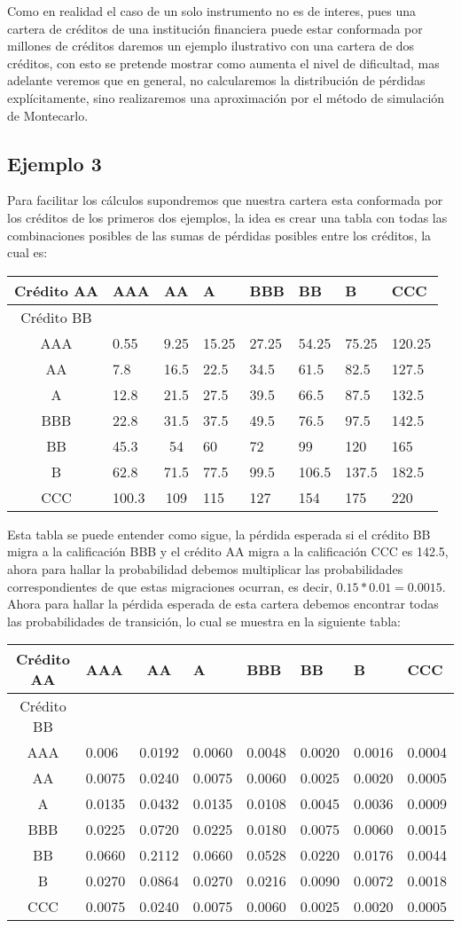 \documentclass[
  12pt,
]{krantz}
\theoremstyle{definition}
\theoremstyle{definition}
\theoremstyle{definition}
\theoremstyle{remark}
\begin{document}
Como en realidad el caso de un solo instrumento no es de interes, pues una cartera de créditos de una institución financiera puede estar conformada por millones de créditos daremos un ejemplo ilustrativo con una cartera de dos créditos, con esto se pretende mostrar como aumenta el nivel de dificultad, mas adelante veremos que en general, no calcularemos la distribución de pérdidas explícitamente, sino realizaremos una aproximación por el método de simulación de Montecarlo.

\hypertarget{ejemplo-3}{%
\subsection{Ejemplo 3}\label{ejemplo-3}}

Para facilitar los cálculos supondremos que nuestra cartera esta conformada por los créditos de los primeros dos ejemplos, la idea es crear una tabla con todas las combinaciones posibles de las sumas de pérdidas posibles entre los créditos, la cual es:

\begin{longtable}[]{@{}clclllll@{}}
\toprule
Crédito AA & AAA & AA & A & BBB & BB & B & CCC\tabularnewline
\midrule
\endhead
Crédito BB & & & & & & &\tabularnewline
AAA & 0.55 & 9.25 & 15.25 & 27.25 & 54.25 & 75.25 & 120.25\tabularnewline
AA & 7.8 & 16.5 & 22.5 & 34.5 & 61.5 & 82.5 & 127.5\tabularnewline
A & 12.8 & 21.5 & 27.5 & 39.5 & 66.5 & 87.5 & 132.5\tabularnewline
BBB & 22.8 & 31.5 & 37.5 & 49.5 & 76.5 & 97.5 & 142.5\tabularnewline
BB & 45.3 & 54 & 60 & 72 & 99 & 120 & 165\tabularnewline
B & 62.8 & 71.5 & 77.5 & 99.5 & 106.5 & 137.5 & 182.5\tabularnewline
CCC & 100.3 & 109 & 115 & 127 & 154 & 175 & 220\tabularnewline
\bottomrule
\end{longtable}

Esta tabla se puede entender como sigue, la pérdida esperada si el crédito BB migra a la calificación BBB y el crédito AA migra a la calificación CCC es 142.5, ahora para hallar la probabilidad debemos multiplicar las probabilidades correspondientes de que estas migraciones ocurran, es decir, \(0.15*0.01=0.0015\). Ahora para hallar la pérdida esperada de esta cartera debemos encontrar todas las probabilidades de transición, lo cual se muestra en la siguiente tabla:

\begin{longtable}[]{@{}clclllll@{}}
\toprule
Crédito AA & AAA & AA & A & BBB & BB & B & CCC\tabularnewline
\midrule
\endhead
Crédito BB & & & & & & &\tabularnewline
AAA & 0.006 & 0.0192 & 0.0060 & 0.0048 & 0.0020 & 0.0016 & 0.0004\tabularnewline
AA & 0.0075 & 0.0240 & 0.0075 & 0.0060 & 0.0025 & 0.0020 & 0.0005\tabularnewline
A & 0.0135 & 0.0432 & 0.0135 & 0.0108 & 0.0045 & 0.0036 & 0.0009\tabularnewline
BBB & 0.0225 & 0.0720 & 0.0225 & 0.0180 & 0.0075 & 0.0060 & 0.0015\tabularnewline
BB & 0.0660 & 0.2112 & 0.0660 & 0.0528 & 0.0220 & 0.0176 & 0.0044\tabularnewline
B & 0.0270 & 0.0864 & 0.0270 & 0.0216 & 0.0090 & 0.0072 & 0.0018\tabularnewline
CCC & 0.0075 & 0.0240 & 0.0075 & 0.0060 & 0.0025 & 0.0020 & 0.0005\tabularnewline
\bottomrule
\end{longtable}
\end{document}
